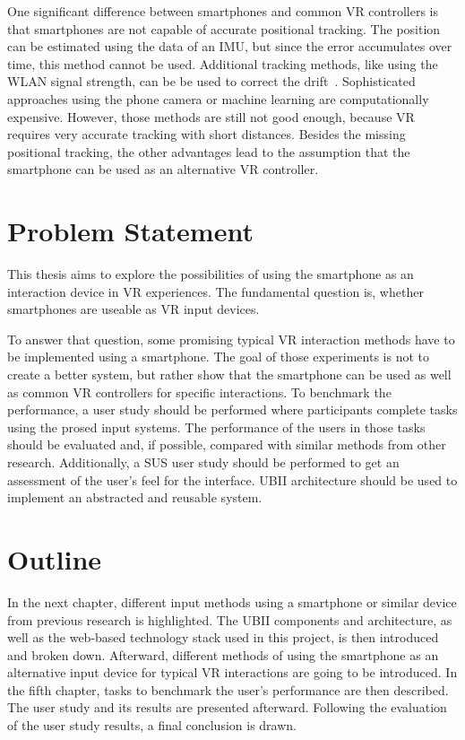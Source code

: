 One significant difference between smartphones and common \ac{VR} controllers is that smartphones are not capable of accurate positional tracking. The position can be estimated using the data of an \ac{IMU}, but since the error accumulates over time, this method cannot be used. Additional tracking methods, like using the \ac{WLAN} signal strength, can be be used to correct the drift~\cite{Zhang.2015}. Sophisticated approaches using the phone camera or machine learning are computationally expensive. However, those methods are still not good enough, because \ac{VR} requires very accurate tracking with short distances.
Besides the missing positional tracking, the other advantages lead to the assumption that the smartphone can be used as an alternative \ac{VR} controller. 


\section{Problem Statement}\label{section:problem-statement}
This thesis aims to explore the possibilities of using the smartphone as an interaction device in \ac{VR} experiences. The fundamental question is, whether smartphones are useable as \ac{VR} input devices. 

To answer that question, some promising typical \ac{VR} interaction methods have to be implemented using a smartphone. The goal of those experiments is not to create a better system, but rather show that the smartphone can be used as well as common \ac{VR} controllers for specific interactions. To benchmark the performance, a user study should be performed where participants complete tasks using the prosed input systems.
The performance of the users in those tasks should be evaluated and, if possible, compared with similar methods from other research. Additionally, a \ac{SUS} user study should be performed to get an assessment of the user's feel for the interface.
\ac{UBII} architecture should be used to implement an abstracted and reusable system.


\section{Outline}\label{section:outline}
In the next chapter, different input methods using a smartphone or similar device from previous research is highlighted. The \ac{UBII} components and architecture, as well as the web-based technology stack used in this project, is then introduced and broken down. Afterward, different methods of using the smartphone as an alternative input device for typical \ac{VR} interactions are going to be introduced. In the fifth chapter, tasks to benchmark the user's performance are then described. The user study and its results are presented afterward. Following the evaluation of the user study results, a final conclusion is drawn.